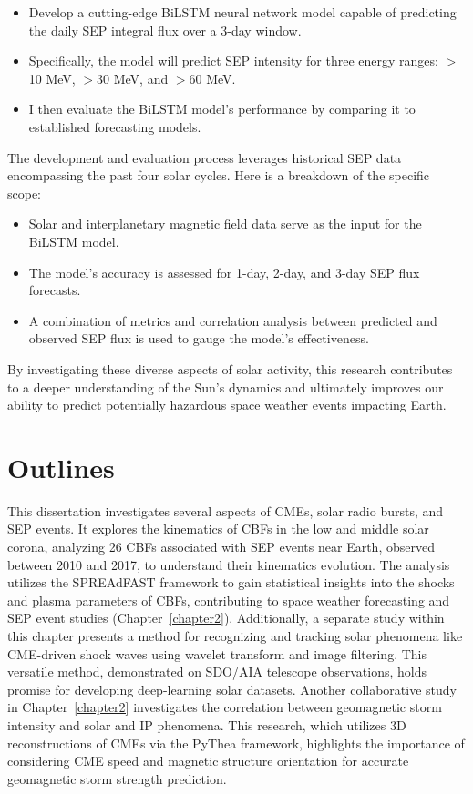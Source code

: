 \begin{itemize}
	\item Develop a cutting-edge BiLSTM neural network model capable of predicting the daily SEP integral flux over a 3-day window.
	\item Specifically, the model will predict SEP intensity for three energy ranges: $>$10 MeV, $>$30 MeV, and $>$60 MeV.
	\item I then evaluate the BiLSTM model's performance by comparing it to established forecasting models.
\end{itemize}

The development and evaluation process leverages historical SEP data encompassing the past four solar cycles. Here is a breakdown of the specific scope:

\begin{itemize}
	\item Solar and interplanetary magnetic field data serve as the input for the BiLSTM model.
	\item The model's accuracy is assessed for 1-day, 2-day, and 3-day SEP flux forecasts.
	\item A combination of metrics and correlation analysis between predicted and observed SEP flux is used to gauge the model's effectiveness.
\end{itemize}

By investigating these diverse aspects of solar activity, this research contributes to a deeper understanding of the Sun's dynamics and ultimately improves our ability to predict potentially hazardous space weather events impacting Earth.

\section{Outlines}
This dissertation investigates several aspects of CMEs, solar radio bursts, and SEP events. It explores the kinematics of CBFs in the low and middle solar corona, analyzing 26 CBFs associated with SEP events near Earth, observed between 2010 and 2017, to understand their kinematics evolution. The analysis utilizes the SPREAdFAST framework to gain statistical insights into the shocks and plasma parameters of CBFs, contributing to space weather forecasting and SEP event studies (Chapter~\ref{chapter2}). Additionally, a separate study within this chapter presents a method for recognizing and tracking solar phenomena like CME-driven shock waves using wavelet transform and image filtering. This versatile method, demonstrated on SDO/AIA telescope observations, holds promise for developing deep-learning solar datasets. Another collaborative study in Chapter~\ref{chapter2} investigates the correlation between geomagnetic storm intensity and solar and IP phenomena. This research, which utilizes 3D reconstructions of CMEs via the PyThea framework, highlights the importance of considering CME speed and magnetic structure orientation for accurate geomagnetic storm strength prediction.

